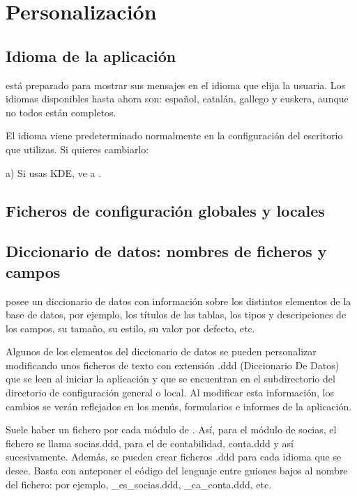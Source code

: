 \chapter{Personalización}
\section{Idioma de la aplicación}
\appname está preparado para mostrar sus mensajes en el idioma que
elija la usuaria. Los idiomas disponibles hasta ahora son: español,
catalán, gallego y euskera, aunque no todos están completos.

El idioma viene predeterminado normalmente en la configuración del
escritorio que utilizas. Si quieres cambiarlo:

a) Si usas KDE, ve a \textstyleGUIELEMENT{$\rightarrow $}\textstyleGUIELEMENT{$\rightarrow $}\textstyleGUIELEMENT{$\rightarrow
$}.

\section{Ficheros de configuración globales y locales}
\section{Diccionario de datos: nombres de ficheros y campos }
\appname posee un diccionario de datos con información sobre los
distintos elementos de la base de datos, por ejemplo, los títulos de
las tablas, los tipos y descripciones de los campos, su tamaño, su
estilo, su valor por defecto, etc.

Algunos de los elementos del diccionario de datos se pueden personalizar
modificando unos ficheros de texto con extensión .ddd (Diccionario De
Datos) que se leen al iniciar la aplicación y que se encuentran en el
subdirectorio  del directorio de
configuración general o local. Al modificar esta información, los
cambios se verán reflejados en los menús, formularios e informes de
la aplicación.

Suele haber un fichero por cada módulo de \appname. Así, para el
módulo de socias, el fichero se llama socias.ddd, para el de
contabilidad, conta.ddd y así sucesivamente. Además, se pueden
crear ficheros .ddd para cada idioma que se desee. Basta con anteponer
el código del lenguaje entre guiones bajos al nombre del fichero: por
ejemplo, \_es\_socias.ddd, \_ca\_conta.ddd, etc.

